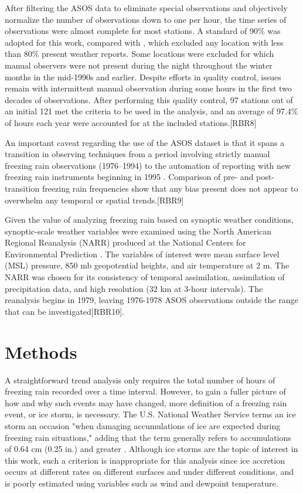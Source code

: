 \documentclass[twocol]{ametsoc}
\begin{document}
After filtering the ASOS data to eliminate special observations and objectively normalize the number of observations down to one per hour, the time series of observations were almost complete for most stations.  A standard of 90\% was adopted for this work, compared with \citet{cortinas2000climatology}, which excluded any location with less than 80\% present weather reports. Some locations were excluded for which manual observers were not present during the night throughout the winter months in the mid-1990s and earlier. Despite efforts in quality control, issues remain with intermittent manual observation during some hours in the first two decades of observations. After performing this quality control, 97 stations out of an initial 121 met the criteria to be used in the analysis, and an average of 97.4\% of hours each year were accounted for at the included stations.[RBR8]

An important caveat regarding the use of the ASOS dataset is that it spans a transition in observing techniques from a period involving strictly manual freezing rain observations (1976--1994) to the automation of reporting with new freezing rain instruments beginning in 1995 \citep{ramsay1995status,asos1998}. Comparison of pre- and post-transition freezing rain frequencies show that any bias present does not appear to overwhelm any temporal or spatial trends.[RBR9]

Given the value of analyzing freezing rain based on synoptic weather conditions, synoptic-scale weather variables were examined using the North American Regional Reanalysis (NARR) produced at the National Centers for Environmental Prediction \citep{mesinger2006north}. The variables of interest were mean surface level (MSL) pressure, 850 mb geopotential heights, and air temperature at 2 m. The NARR was chosen for its consistency of temporal assimilation, assimilation of precipitation data, and high resolution (32 km at 3-hour intervals). The reanalysis begins in 1979, leaving 1976-1978 ASOS observations outside the range that can be investigated[RBR10].


\section{Methods}
A straightforward trend analysis only requires the total number of hours of freezing rain recorded over a time interval. However, to gain a fuller picture of how and why such events may have changed, more definition of a freezing rain event, or ice storm, is necessary. The U.S. National Weather Service terms an ice storm an occasion "when damaging accumulations of ice are expected during freezing rain situations," adding that the term generally refers to accumulations of 0.64 cm (0.25 in.) and greater \citep{nwsglossary}. Although ice storms are the topic of interest in this work, such a criterion is inappropriate for this analysis since ice accretion occurs at different rates on different surfaces and under different conditions, and is poorly estimated using variables such as wind and dewpoint temperature. 
\end{document}
